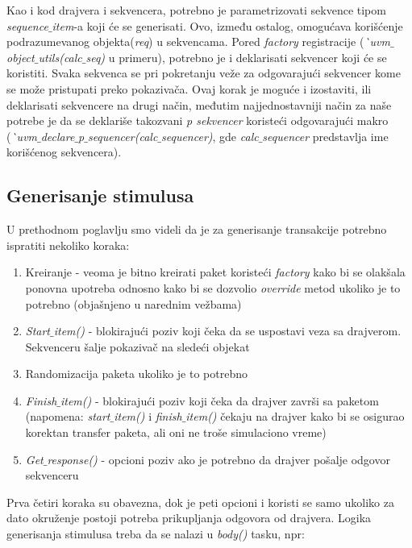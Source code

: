 Kao i kod drajvera i sekvencera, potrebno je parametrizovati sekvence tipom
\emph{sequence\(\_\)item}-a koji će se generisati. Ovo, između ostalog,
omogućava korišćenje podrazumevanog objekta(\emph{req}) u sekvencama. Pored \emph{factory}
registracije (\emph{\`\ uvm\(\_\)object\(\_\)utils(calc\(\_\)seq)} u primeru),
potrebno je i deklarisati sekvencer koji će se koristiti. Svaka sekvenca se pri
pokretanju veže za odgovarajući sekvencer kome se može pristupati preko
pokazivača. Ovaj korak je moguće i izostaviti, ili deklarisati sekvencere na
drugi način, međutim najjednostavniji način za naše potrebe je da se deklariše
takozvani \emph{p sekvencer} koristeći odgovarajući makro
(\emph{\`\ uvm\(\_\)declare\(\_\)p\(\_\)sequencer(calc\(\_\)sequencer)}, gde
\emph{calc\(\_\)sequencer} predstavlja ime korišćenog sekvencera).


\subsection{Generisanje stimulusa}

U prethodnom poglavlju smo videli da je za generisanje transakcije potrebno
ispratiti nekoliko koraka:

\begin{enumerate}
\item Kreiranje - veoma je bitno kreirati paket koristeći \emph{factory} kako bi
  se olakšala ponovna upotreba odnosno kako bi se dozvolio \emph{override} metod
  ukoliko je to potrebno (objašnjeno u narednim vežbama)
\item \emph{Start\(\_\)item()} - blokirajući poziv koji čeka da se uspostavi
  veza sa drajverom. Sekvenceru šalje pokazivač na sledeći objekat
\item Randomizacija paketa ukoliko je to potrebno
\item \emph{Finish\(\_\)item()} - blokirajući poziv koji čeka da drajver završi
  sa paketom (napomena: \emph{start\(\_\)item()} i \emph{finish\(\_\)item()}
  čekaju na drajver kako bi se osigurao korektan transfer paketa, ali oni ne
  troše simulaciono vreme)
\item \emph{Get\(\_\)response()} - opcioni poziv ako je potrebno da drajver
  pošalje odgovor sekvenceru
\end{enumerate}

Prva četiri koraka su obavezna, dok je peti opcioni i koristi se samo ukoliko za
dato okruženje postoji potreba prikupljanja odgovora od drajvera. Logika
generisanja stimulusa treba da se nalazi u \emph{body()} tasku, npr:

